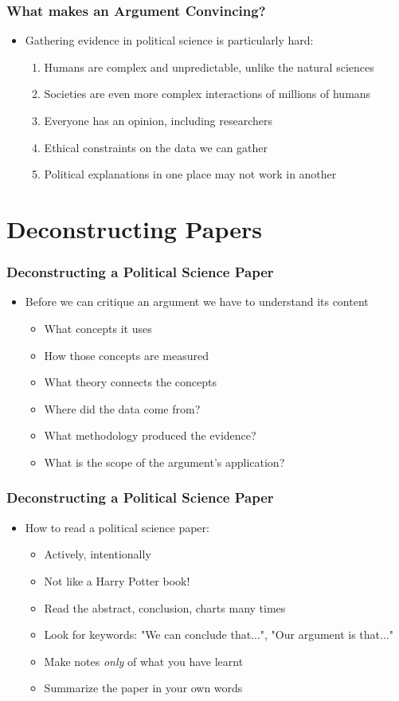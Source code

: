 \documentclass[xcolor=x11names,compress]{beamer}\usepackage[]{graphicx}\usepackage[]{color}
\renewcommand{\(}{\begin{columns}}
\renewcommand{\)}{\end{columns}}
\newcommand{\<}[1]{\begin{column}{#1}}
\renewcommand{\>}{\end{column}}
\begin{document}
\begin{frame}
\begin{frame}
\begin{frame}
\frametitle{What makes an Argument Convincing?}
\begin{itemize}
\item Gathering evidence in political science is particularly hard:
\begin{enumerate}
\item Humans are complex and unpredictable, unlike the natural sciences
\item Societies are even more complex interactions of millions of humans
\item Everyone has an opinion, including researchers
\item Ethical constraints on the data we can gather
\item Political explanations in one place may not work in another
\end{enumerate}
\end{itemize}
\end{frame}

\section{Deconstructing Papers}

\begin{frame}
\frametitle{Deconstructing a Political Science Paper}
\begin{itemize}
\item Before we can critique an argument we have to understand its content
\begin{itemize}
\item What concepts it uses
\item How those concepts are measured
\item What theory connects the concepts
\item Where did the data come from?
\item What methodology produced the evidence?
\item What is the scope of the argument's application?
\end{itemize}
\end{itemize}
\end{frame}

\begin{frame}
\frametitle{Deconstructing a Political Science Paper}
\begin{itemize}
\item How to read a political science paper:
\begin{itemize}
\item Actively, intentionally
\item Not like a Harry Potter book!
\item Read the abstract, conclusion, charts many times
\item Look for keywords: "We can conclude that...", "Our argument is that..."
\item Make notes \textit{only} of what you have learnt
\item Summarize the paper in your own words
\end{itemize}
\end{itemize}
\end{frame}


\end{frame}
\end{frame}
\end{document}
